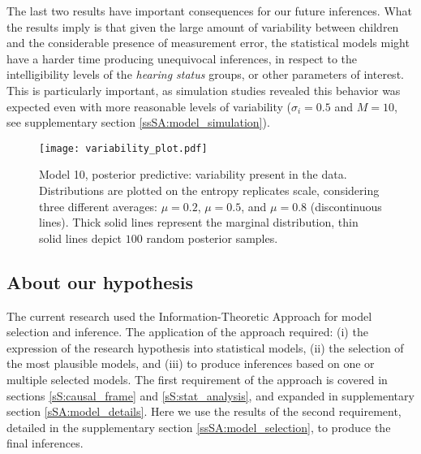 The last two results have important consequences for our future inferences. What the results imply is that given the large amount of variability between children and the considerable presence of measurement error, the statistical models might have a harder time producing unequivocal inferences, in respect to the intelligibility levels of the \textit{hearing status} groups, or other parameters of interest. This is particularly important, as simulation studies revealed this behavior was expected even with more reasonable levels of variability ($\sigma_{i}=0.5$ and $M=10$, see supplementary section \ref{ssSA:model_simulation}).
%
\begin{figure}[!h]
	\centering
	\texttt{[image: variability\_plot.pdf]}
	\caption[Model 10, posterior predictive: variability present in the data]{Model 10, posterior predictive: variability present in the data. Distributions are plotted on the entropy replicates scale, considering three different averages: $\mu=0.2$, $\mu=0.5$, and $\mu=0.8$ (discontinuous lines). Thick solid lines represent the marginal distribution, thin solid lines depict $100$ random posterior samples.}
	\label{fig:variability}
\end{figure}
%
%
\subsection{About our hypothesis} \label{sS:results_hypothesis}
%
The current research used the Information-Theoretic Approach \citep{Anderson_2008, Chamberlain_1965} for model selection and inference. The application of the approach required: (i) the expression of the research hypothesis into statistical models, (ii) the selection of the most plausible models, and (iii) to produce inferences based on one or multiple selected models. The first requirement of the approach is covered in sections \ref{sS:causal_frame} and \ref{sS:stat_analysis}, and expanded in supplementary section \ref{sSA:model_details}. Here we use the results of the second requirement, detailed in the supplementary section \ref{ssSA:model_selection}, to produce the final inferences. 

